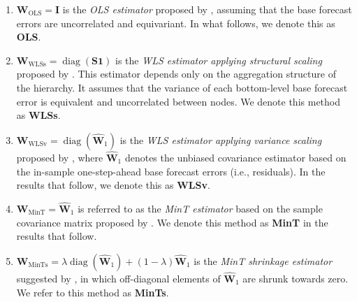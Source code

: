 \documentclass[11pt,a4paper,]{article}
\providecommand{\tightlist}{%
  \setlength{\itemsep}{0pt}\setlength{\parskip}{0pt}}
\begin{document}
\begin{enumerate}
\def\labelenumi{\arabic{enumi}.}
\tightlist
\item
  \(\boldsymbol{W}_{\text{OLS}} = \boldsymbol{I}\) is the \emph{OLS
  estimator} proposed by \textcite{Hyndman2011-sd}, assuming that the
  base forecast errors are uncorrelated and equivariant. In what
  follows, we denote this as \textbf{OLS}.
\item
  \(\boldsymbol{W}_{\text{WLSs}} = \operatorname{diag}(\boldsymbol{S} \mathbf{1})\)
  is the \emph{WLS estimator applying structural scaling} proposed by
  \textcite{Athanasopoulos2017-jj}. This estimator depends only on the
  aggregation structure of the hierarchy. It assumes that the variance
  of each bottom-level base forecast error is equivalent and
  uncorrelated between nodes. We denote this method as \textbf{WLSs}.
\item
  \(\boldsymbol{W}_{\text{WLSv}} = \operatorname{diag}(\hat{\boldsymbol{W}}_1)\)
  is the \emph{WLS estimator applying variance scaling} proposed by
  \textcite{Hyndman2016-cz}, where \(\hat{\boldsymbol{W}}_1\) denotes
  the unbiased covariance estimator based on the in-sample
  one-step-ahead base forecast errors (i.e., residuals). In the results
  that follow, we denote this as \textbf{WLSv}.
\item
  \(\boldsymbol{W}_{\text{MinT}} = \hat{\boldsymbol{W}}_1\) is referred
  to as the \emph{MinT estimator} based on the sample covariance matrix
  proposed by \textcite{Wickramasuriya2019-fc}. We denote this method as
  \textbf{MinT} in the results that follow.
\item
  \(\boldsymbol{W}_{\text{MinTs}} = \lambda\operatorname{diag}(\hat{\boldsymbol{W}}_1) + (1-\lambda)\hat{\boldsymbol{W}}_1\)
  is the \emph{MinT shrinkage estimator} suggested by
  \textcite{Wickramasuriya2019-fc}, in which off-diagonal elements of
  \(\hat{\boldsymbol{W}}_1\) are shrunk towards zero. We refer to this
  method as \textbf{MinTs}.
\end{enumerate}
\end{document}
